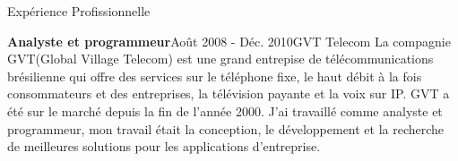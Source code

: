 \documentclass{resume}
\begin{document}
\begin{rSection}{Expérience Profissionnelle}
    \begin{rSubsection}{\bf Analyste et programmeur}{Août 2008 - Déc. 2010}{GVT Telecom}{}
    La compagnie GVT(Global Village Telecom) est une grand entrepise de télécommunications brésilienne qui offre des services sur le téléphone fixe, le haut débit à la fois consommateurs et des entreprises, la télévision payante et la voix sur IP. GVT a été sur le marché depuis la fin de l'année 2000. J'ai travaillé comme analyste et programmeur, mon travail était la conception, le développement et la recherche de meilleures solutions pour les applications d'entreprise.
    \end{rSubsection}

\end{rSection}
\end{document}
